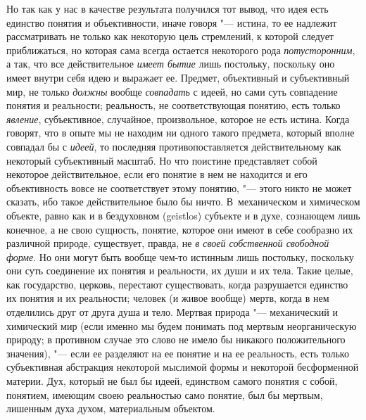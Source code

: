 Но так как у нас в качестве результата получился тот вывод,
что идея есть единство понятия и объективности, иначе говоря
"--- истина, то ее надлежит рассматривать не только как
некоторую цель стремлений, к которой следует приближаться, но которая сама
всегда остается некоторого рода
{\em потусторонним}, а
так, что все действительное {\em имеет
бытие} лишь постольку, поскольку оно имеет внутри себя идею
и выражает ее. Предмет, объективный и субъективный мир, не только
{\em должны} вообще
{\em совпадать}
с идеей, но сами суть совпадение понятия и реальности;
реальность, не соответствующая понятию, есть только
{\em явление},
субъективное, случайное, произвольное, которое не есть
истина. Когда говорят, что в опыте мы не находим ни одного такого предмета,
который вполне совпадал бы с
{\em идеей}, то последняя
противопоставляется действительному как некоторый
субъективный масштаб. Но что поистине представляет собой некоторое
действительное, если его понятие в нем не находится и его объективность
вовсе не соответствует этому понятию, "--- этого никто не может
сказать, ибо такое действительное было бы ничто. В~механическом и
химическом объекте, равно как и в бездуховном (geistlos)
субъекте и в духе, сознающем лишь конечное, а не свою
сущность, понятие, которое они имеют в себе сообразно их различной природе,
существует, правда, не {\em в своей
собственной свободной форме}. Но они могут быть вообще
чем-то истинным лишь постольку, поскольку они суть соединение их понятия и
реальности, их души и их тела. Такие целые, как государство, церковь,
перестают существовать, когда разрушается единство их понятия и их
реальности; человек (и живое вообще) мертв, когда в нем отделились друг от
друга душа и тело. Мертвая природа "--- механический и
химический мир (если именно мы будем понимать под мертвым неорганическую
природу; в противном случае это слово не имело бы никакого положительного
значения), "--- если ее разделяют на ее понятие и на ее
реальность, есть только субъективная абстракция некоторой мыслимой формы и
некоторой бесформенной материи. Дух, который не был бы идеей, единством
самого понятия с собой, понятием, имеющим своею реальностью само понятие,
был бы мертвым, лишенным духа духом, материальным объектом.

